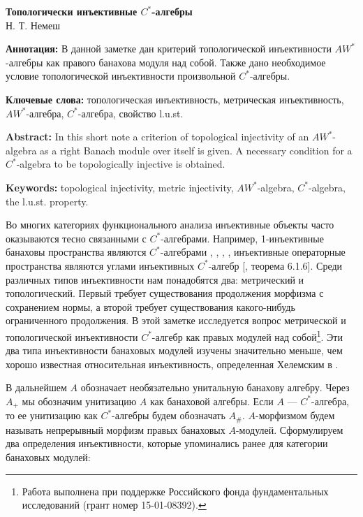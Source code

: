 \documentclass[12pt]{article}
\begin{document}
\begin{center}

\Large \textbf{Топологически инъективные $C^*$-алгебры}\\[0.5cm]
\small {Н. Т. Немеш}\\[0.5cm]

\end{center}
\thispagestyle{empty}

\textbf{Аннотация:} В данной заметке дан критерий топологической инъективности $AW^*$-алгебры как правого банахова модуля над собой. Также дано необходимое условие топологической инъективности произвольной $C^*$-алгебры. 

\medskip
\textbf{Ключевые слова:} топологическая инъективность, метрическая инъективность, $AW^*$-алгебра, $C^*$-алгебра, свойство l.u.st.

\medskip
\textbf{Abstract:} In this short note a criterion of topological injectivity of an $AW^*$-algebra as a right Banach module over itself is given. A necessary condition for a $C^*$-algebra to be topologically injective is obtained.

\medskip
\textbf{Keywords:} topological injectivity, metric injectivity, $AW^*$-algebra, $C^*$-algebra, the l.u.st. property.

\bigskip

Во многих категориях функционального анализа инъективные объекты часто оказываются тесно связанными с $C^*$-алгебрами. Например, 1-инъективные банаховы пространства являются $C^*$-алгебрами \cite{NachThOfHahnBanachType}, \cite{GooProjInNorLinSp}, \cite{KellBanSpWithExtProp}, \cite{HasumiExtPropComplBanSp}, инъективные операторные пространства являются углами инъективных $C^*$-алгебр [\cite{RuanOpSp}, теорема 6.1.6]. Среди различных типов инъективности нам понадобятся два: метрический и топологический. Первый требует существования продолжения морфизма с сохранением нормы, а второй требует существования какого-нибудь ограниченного продолжения. В этой заметке исследуется вопрос метрической и топологической инъективности $C^*$-алгебр как правых модулей над собой\footnote{Работа выполнена при поддержке Российского фонда фундаментальных исследований (грант номер 15-01-08392).}. Эти два типа инъективности банаховых модулей изучены значительно меньше, чем хорошо известная относительная инъективность, определенная Хелемским в \cite{HelemSheinbergFlatBanModAndAmenBanAlg}.

В дальнейшем $A$ обозначает необязательно унитальную банахову алгебру. Через $A_+$ мы обозначим унитизацию $A$ как банаховой алгебры. 
Если $A$ --- $C^*$-алгебра, то ее унитизацию как $C^*$-алгебры будем обозначать $A_\#$. 
$A$-морфизмом будем называть непрерывный морфизм правых банаховых $A$-модулей. Сформулируем два определения инъективности, которые упоминались ранее для категории банаховых модулей:
\end{document}

